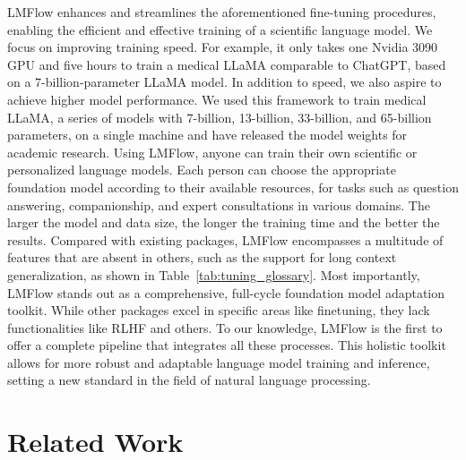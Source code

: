 \documentclass[11pt]{article}
\newcommand{\ModelName}{LMFlow}
\begin{document}
{\ModelName} enhances and streamlines the aforementioned fine-tuning procedures, enabling the efficient and effective training of a scientific language model.
We focus on improving training speed.
For example, it only takes one Nvidia 3090 GPU and five hours to train a medical LLaMA comparable to ChatGPT, based on a 7-billion-parameter LLaMA model.
In addition to speed, we also aspire to achieve higher model performance.
We used this framework to train medical LLaMA, a series of models with 7-billion, 13-billion, 33-billion, and 65-billion parameters, on a single machine and have released the model weights for academic research. 
Using LMFlow, anyone can train their own scientific or personalized language models.
Each person can choose the appropriate foundation model according to their available resources, for tasks such as question answering, companionship, and expert consultations in various domains.
The larger the model and data size, the longer the training time and the better the results. 
Compared with existing packages, {\ModelName} encompasses a multitude of features that are absent in others, such as the support for long context generalization, as shown in Table~\ref{tab:tuning_glossary}. 
Most importantly, {\ModelName} stands out as a comprehensive, full-cycle foundation model adaptation toolkit. 
While other packages excel in specific areas like finetuning, they lack functionalities like RLHF and others. 
To our knowledge, {\ModelName} is the first to offer a complete pipeline that integrates all these processes. 
This holistic toolkit allows for more robust and adaptable language model training and inference, setting a new standard in the field of natural language processing.


\section{Related Work}
\end{document}
